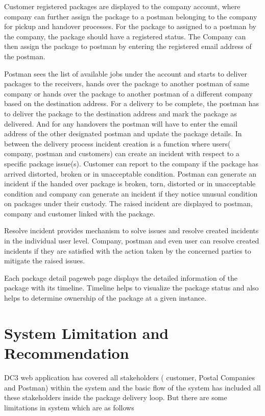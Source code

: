 Customer registered packages are displayed to the company account, where company can further assign the package to a postman belonging to the company for pickup and handover processes. For the package to assigned to a postman by the company, the package should have a registered status. The Company can then assign the package to postman by entering the registered email address of the postman.

Postman sees the list of available jobs under the account and starts to deliver packages to the receivers, hands over the package to another postman of same company or hands over the package to another postman of a different company based on the destination address. For a delivery to be complete, the postman has to deliver the package to the destination address and mark the package as delivered. And for any handovers the postman will have to enter the email address of the other designated postman and update the package details.
In between the delivery process incident creation is a function where users( company, postman and customers) can create an incident with respect to a specific package issue(s). Customer can report to the company if the package has arrived distorted, broken or in unacceptable condition. Postman can generate an incident if the handed over package is broken, torn, distorted or in unacceptable condition and company can generate an incident if they notice unusual condition on packages under their custody. The raised incident are displayed to postman, company and customer linked with the package.

Resolve incident provides mechanism to solve issues and resolve created incidents in the individual user level. Company, postman and even user can resolve created incidents if they are satisfied with the action taken by the concerned parties to mitigate the raised issues.

Each package detail pageweb page displays the detailed information of the package with its timeline. Timeline helps to visualize the package status and also helps to determine ownership of the package at a given instance.

\section{System Limitation and Recommendation}
DC3  web application has covered all stakeholders ( customer, Postal Companies and Postman) within the system and the basic flow of the system has included all these stakeholders inside the package delivery loop. But there are some limitations in system which are as follows

